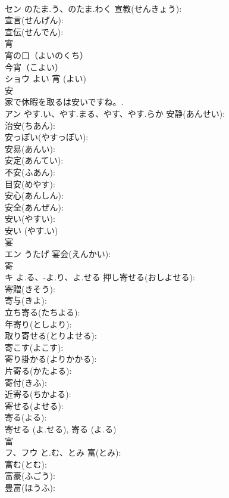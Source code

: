 \documentclass[8pt]{extreport}
\begin{document}
\begin{CJK}{UTF8}{min}
\\	セン	のたま.う、のたま.わく	宣教(せんきょう): 
\\	宣言(せんげん): 
\\	宣伝(せんでん): 
\\	宵			
\\	宵の口（よいのくち）
\\	今宵（こよい）
\\	ショウ	よい		宵 (よい)
\\	安			
\\	家で休暇を取るは安いですね。.	
\\	アン	やす.い、やす.まる、やす、やす.らか	安静(あんせい): 
\\	治安(ちあん): 
\\	安っぽい(やすっぽい): 
\\	安易(あんい): 
\\	安定(あんてい): 
\\	不安(ふあん): 
\\	目安(めやす): 
\\	安心(あんしん): 
\\	安全(あんぜん): 
\\	安い(やすい): 
\\	安い (やす.い)
\\	宴			
\\	エン	うたげ	宴会(えんかい): 
\\	寄			
\\	キ	よ.る、-よ.り、よ.せる	押し寄せる(おしよせる): 
\\	寄贈(きそう): 
\\	寄与(きよ): 
\\	立ち寄る(たちよる): 
\\	年寄り(としより): 
\\	取り寄せる(とりよせる): 
\\	寄こす(よこす): 
\\	寄り掛かる(よりかかる): 
\\	片寄る(かたよる): 
\\	寄付(きふ): 
\\	近寄る(ちかよる): 
\\	寄せる(よせる): 
\\	寄る(よる): 
\\	寄せる (よ.せる), 寄る (よ.る)
\\	富			
\\	フ、フウ	と.む、とみ	富(とみ): 
\\	富む(とむ): 
\\	富豪(ふごう): 
\\	豊富(ほうふ): 

\end{CJK}
\end{document}
